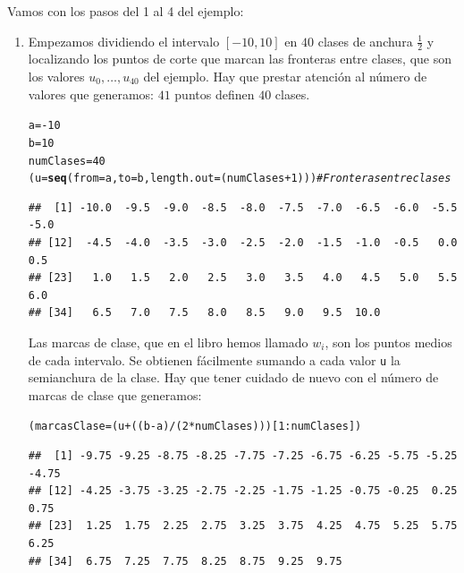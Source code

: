 \documentclass[10pt,a4paper]{article}\usepackage[]{graphicx}\usepackage[]{color}
\makeatletter
\newcommand{\hlnum}[1]{\textcolor[rgb]{0.686,0.059,0.569}{#1}}%
\newcommand{\hlcom}[1]{\textcolor[rgb]{0.678,0.584,0.686}{\textit{#1}}}%
\newcommand{\hlopt}[1]{\textcolor[rgb]{0,0,0}{#1}}%
\newcommand{\hlstd}[1]{\textcolor[rgb]{0.345,0.345,0.345}{#1}}%
\newcommand{\hlkwb}[1]{\textcolor[rgb]{0.69,0.353,0.396}{#1}}%
\newcommand{\hlkwc}[1]{\textcolor[rgb]{0.333,0.667,0.333}{#1}}%
\newcommand{\hlkwd}[1]{\textcolor[rgb]{0.737,0.353,0.396}{\textbf{#1}}}%
\newenvironment{kframe}{%
 \def\at@end@of@kframe{}%
 \ifinner\ifhmode%
  \def\at@end@of@kframe{\end{minipage}}%
  \begin{minipage}{\columnwidth}%
 \fi\fi%
 \def\FrameCommand##1{\hskip\@totalleftmargin \hskip-\fboxsep
 \colorbox{shadecolor}{##1}\hskip-\fboxsep
     \hskip-\linewidth \hskip-\@totalleftmargin \hskip\columnwidth}%
 \MakeFramed {\advance\hsize-\width
   \@totalleftmargin\z@ \linewidth\hsize
   \@setminipage}}%
 {\par\unskip\endMakeFramed%
 \at@end@of@kframe}
\newenvironment{knitrout}{}{} %
\makeatother
\begin{document}
Vamos con los pasos del 1 al 4 del ejemplo:
\begin{enumerate}

\item Empezamos dividiendo el intervalo $[-10, 10]$ en $40$ clases de anchura $\frac{1}{2}$ y localizando los puntos de corte que marcan las fronteras entre clases, que son los valores $u_0, \ldots, u_{40}$ del ejemplo. Hay que prestar atención al número de valores que generamos: $41$ puntos definen $40$ clases.

\begin{knitrout}
\color{fgcolor}\begin{kframe}
\begin{alltt}
\hlstd{a} \hlkwb{=} \hlopt{-}\hlnum{10}
\hlstd{b} \hlkwb{=}  \hlnum{10}
\hlstd{numClases} \hlkwb{=} \hlnum{40}
\hlstd{(u} \hlkwb{=} \hlkwd{seq}\hlstd{(}\hlkwc{from}\hlstd{=a,} \hlkwc{to}\hlstd{=b,} \hlkwc{length.out}\hlstd{=(numClases} \hlopt{+} \hlnum{1}\hlstd{)))} \hlcom{# Fronteras entre clases}
\end{alltt}
\begin{verbatim}
##  [1] -10.0  -9.5  -9.0  -8.5  -8.0  -7.5  -7.0  -6.5  -6.0  -5.5  -5.0
## [12]  -4.5  -4.0  -3.5  -3.0  -2.5  -2.0  -1.5  -1.0  -0.5   0.0   0.5
## [23]   1.0   1.5   2.0   2.5   3.0   3.5   4.0   4.5   5.0   5.5   6.0
## [34]   6.5   7.0   7.5   8.0   8.5   9.0   9.5  10.0
\end{verbatim}
\end{kframe}
\end{knitrout}

Las marcas de clase, que en el libro hemos llamado $w_i$, son los puntos medios de cada intervalo. Se obtienen fácilmente sumando a cada valor {\tt u} la semianchura de la clase. Hay que tener cuidado de nuevo con el número de marcas de clase que generamos:
\begin{knitrout}
\color{fgcolor}\begin{kframe}
\begin{alltt}
\hlstd{(marcasClase} \hlkwb{=}  \hlstd{(u} \hlopt{+} \hlstd{((b} \hlopt{-} \hlstd{a)} \hlopt{/} \hlstd{(}\hlnum{2} \hlopt{*} \hlstd{numClases)))[}\hlnum{1}\hlopt{:}\hlstd{numClases])}
\end{alltt}
\begin{verbatim}
##  [1] -9.75 -9.25 -8.75 -8.25 -7.75 -7.25 -6.75 -6.25 -5.75 -5.25 -4.75
## [12] -4.25 -3.75 -3.25 -2.75 -2.25 -1.75 -1.25 -0.75 -0.25  0.25  0.75
## [23]  1.25  1.75  2.25  2.75  3.25  3.75  4.25  4.75  5.25  5.75  6.25
## [34]  6.75  7.25  7.75  8.25  8.75  9.25  9.75
\end{verbatim}
\end{kframe}
\end{knitrout}


\end{enumerate}
\end{document}

